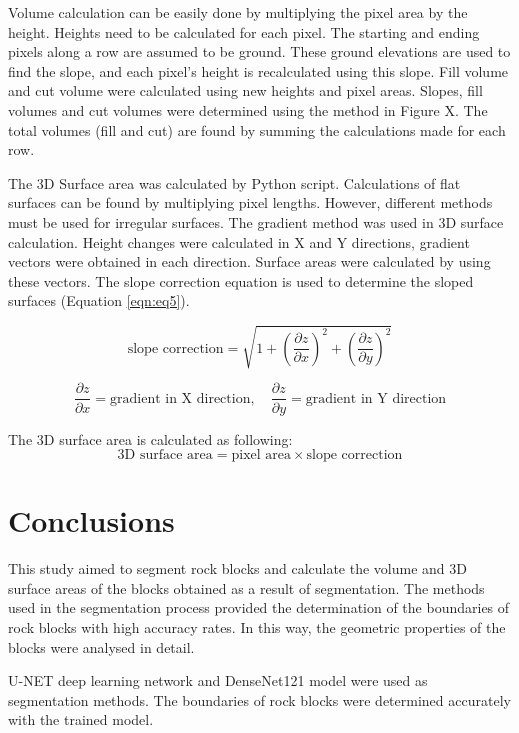 \documentclass[a4paper,fleqn]{cas-sc}
\begin{document}
Volume calculation can be easily done by multiplying the pixel area by the height. Heights need to be calculated for each pixel. The starting and ending pixels along a row are assumed to be ground. These ground elevations are used to find the slope, and each pixel's height is recalculated using this slope. Fill volume and cut volume were calculated using new heights and pixel areas. Slopes, fill volumes and cut volumes were determined using the method in Figure X. The total volumes (fill and cut) are found by summing the calculations made for each row.

The 3D Surface area was calculated by Python script. Calculations of flat surfaces can be found by multiplying pixel lengths. However, different methods must be used for irregular surfaces. The gradient method was used in 3D surface calculation. Height changes were calculated in X and Y directions, gradient vectors were obtained in each direction. Surface areas were calculated by using these vectors. The slope correction equation is used to determine the sloped surfaces (Equation \ref{eqn:eq5}).

\begin{equation}
\label{eqn:eq5}
\text{slope correction} = \sqrt{1 + \left(\frac{\partial z}{\partial x}\right)^2 + \left(\frac{\partial z}{\partial y}\right)^2}
\end{equation}

\[
\frac{\partial z}{\partial x} = \text{gradient in X direction}, \quad \frac{\partial z}{\partial y} = \text{gradient in Y direction}
\]

The 3D surface area is calculated as following:
\[
\text{3D surface area} = \text{pixel area} \times \text{slope correction}
\]


\section{Conclusions}

This study aimed to segment rock blocks and calculate the volume and 3D surface areas of the blocks obtained as a result of segmentation. The methods used in the segmentation process provided the determination of the boundaries of rock blocks with high accuracy rates. In this way, the geometric properties of the blocks were analysed in detail.

U-NET deep learning network and DenseNet121 model were used as segmentation methods. The boundaries of rock blocks were determined accurately with the trained model.
\end{document}
